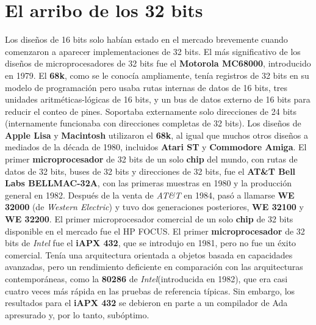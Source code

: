\section{El arribo de los 32 bits}
Los diseños de 16 bits solo habían estado en el mercado brevemente cuando comenzaron a aparecer implementaciones de 32 bits.
El más significativo de los diseños de  microprocesadores de 32 bits fue el \textbf{Motorola MC68000}, introducido en 1979. 
El \textbf{68k}, como se le conocía ampliamente, tenía  registros de 32 bits en su modelo de programación pero usaba rutas internas
de datos de 16 bits, tres unidades aritméticas-lógicas de 16 bits, y un bus de datos externo de 16 bits para reducir 
el conteo de pines. Soportaba externamente solo direcciones de 24 bits (internamente funcionaba con direcciones completas de 
32 bits). Los diseños de \textbf{Apple Lisa} y \textbf{Macintosh} utilizaron el \textbf{68k}, al igual que muchos otros diseños a
mediados de la década de 1980, incluidos \textbf{Atari ST} y \textbf{Commodore Amiga}. El primer \textbf{microprocesador} de 32 bits de
un solo \textbf{chip} del mundo, con rutas de datos de 32 bits, buses de 32 bits y direcciones de 32 bits, fue el \textbf{AT\&T Bell Labs BELLMAC-32A},
con las primeras muestras en 1980 y la producción general en 1982. Después de la venta de \emph{AT\&T} en 1984, pasó a llamarse \textbf{WE 32000}
(de \emph{Western Electric}) y tuvo dos generaciones posteriores, \textbf{WE 32100} y \textbf{WE 32200}. El primer microprocesador comercial de
un solo \textbf{chip} de 32 bits disponible en el mercado fue el HP FOCUS. El primer \textbf{microprocesador} de 32 bits de \emph{Intel} fue el \textbf
{iAPX 432}, que se introdujo en 1981, pero no fue un éxito comercial. Tenía una arquitectura orientada a objetos basada en capacidades avanzadas,
pero un rendimiento deficiente en comparación con las arquitecturas contemporáneas, como la \textbf{80286} de \emph{Intel}(introducida en 1982),
que era casi cuatro veces más rápida en las pruebas de referencia típicas. Sin embargo, los resultados para el \textbf{iAPX 432} se debieron en parte a un
compilador de Ada apresurado y, por lo tanto, subóptimo.

